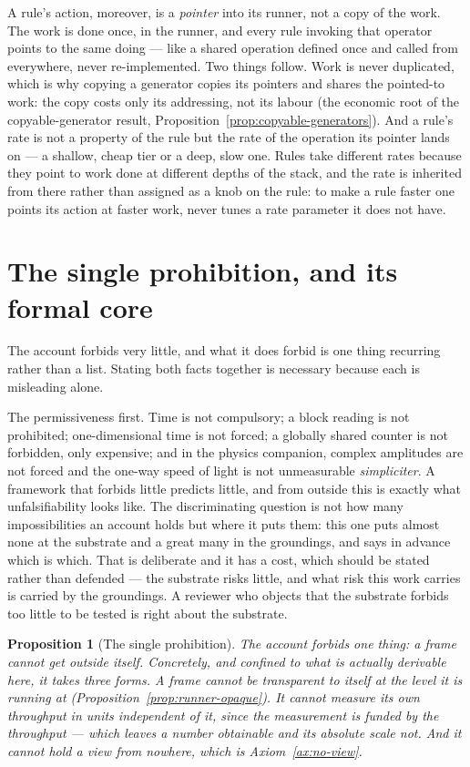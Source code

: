 \documentclass[11pt,a4paper]{article}
\newtheorem{proposition}[definition]{Proposition}
\theoremstyle{remark}\newtheorem{remark}[definition]{Remark}
\begin{document}
A rule's action, moreover, is a \emph{pointer} into its runner, not a copy of the work. The work is done once, in the runner, and every rule invoking that operator points to the same doing --- like a shared operation defined once and called from everywhere, never re-implemented. Two things follow. Work is never duplicated, which is why copying a generator copies its pointers and shares the pointed-to work: the copy costs only its addressing, not its labour (the economic root of the copyable-generator result, Proposition~\ref{prop:copyable-generators}). And a rule's rate is not a property of the rule but the rate of the operation its pointer lands on --- a shallow, cheap tier or a deep, slow one. Rules take different rates because they point to work done at different depths of the stack, and the rate is inherited from there rather than assigned as a knob on the rule: to make a rule faster one points its action at faster work, never tunes a rate parameter it does not have.

\section{The single prohibition, and its formal core}\label{sec:prohibition}

The account forbids very little, and what it does forbid is one thing recurring rather than a list.
Stating both facts together is necessary because each is misleading alone.

The permissiveness first. Time is not compulsory; a block reading is not prohibited; one-dimensional
time is not forced; a globally shared counter is not forbidden, only expensive; and in the physics
companion, complex amplitudes are not forced and the one-way speed of light is not unmeasurable
\emph{simpliciter}. A framework that forbids little predicts little, and from outside this is exactly
what unfalsifiability looks like. The discriminating question is not how many impossibilities an
account holds but where it puts them: this one puts almost none at the substrate and a great many in
the groundings, and says in advance which is which. That is deliberate and it has a cost, which
should be stated rather than defended --- the substrate risks little, and what risk this work carries
is carried by the groundings. A reviewer who objects that the substrate forbids too little to be
tested is right about the substrate.

\begin{proposition}[The single prohibition]\label{prop:prohibition}
The account forbids one thing: \emph{a frame cannot get outside itself}. Concretely, and confined to
what is actually derivable here, it takes three forms. A frame cannot be transparent to itself at the
level it is running at (Proposition~\ref{prop:runner-opaque}). It cannot measure its own throughput in
units independent of it, since the measurement is funded by the throughput --- which leaves a number
obtainable and its absolute scale not. And it cannot hold a view from nowhere, which is Axiom~\ref{ax:no-view}.
\end{proposition}
\end{document}
